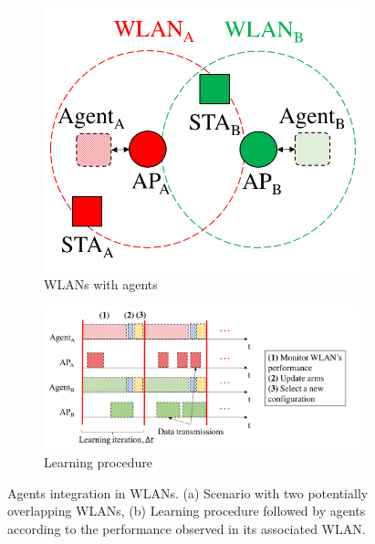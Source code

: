 \documentclass[preprint,12pt]{elsarticle}
\begin{document}
\begin{figure}[h!]
	\centering		
	\begin{subfigure}[b]{0.35\textwidth}
		\includegraphics[width=\textwidth]{agents_a}
		\caption{WLANs with agents}\label{fig:agents_a}
	\end{subfigure}
	\begin{subfigure}[b]{0.6\textwidth}
		\includegraphics[width=\textwidth]{agents_b}
		\caption{Learning procedure}\label{fig:agents_b}
	\end{subfigure}
	\caption{Agents integration in WLANs. (a) Scenario with two potentially overlapping WLANs, (b) Learning procedure followed by agents according to the performance observed in its associated WLAN.}
	\label{fig:agents}
\end{figure}
\end{document}
